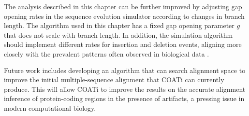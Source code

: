The analysis described in this chapter can be further improved by adjusting gap opening rates in the sequence evolution simulator according to changes in branch length. The algorithm used in this chapter has a fixed gap opening parameter $g$ that does not scale with branch length. In addition, the simulation algorithm should implement different rates for insertion and deletion events, aligning more closely with the prevalent patterns often observed in biological data \citep{zhang2003patterns,de1981causes}.

Future work includes developing an algorithm that can search alignment space to improve the initial multiple-sequence alignment that COATi can currently produce. This will allow COATi to improve the results on the accurate alignment inference of protein-coding regions in the presence of artifacts, a pressing issue in modern computational biology.

